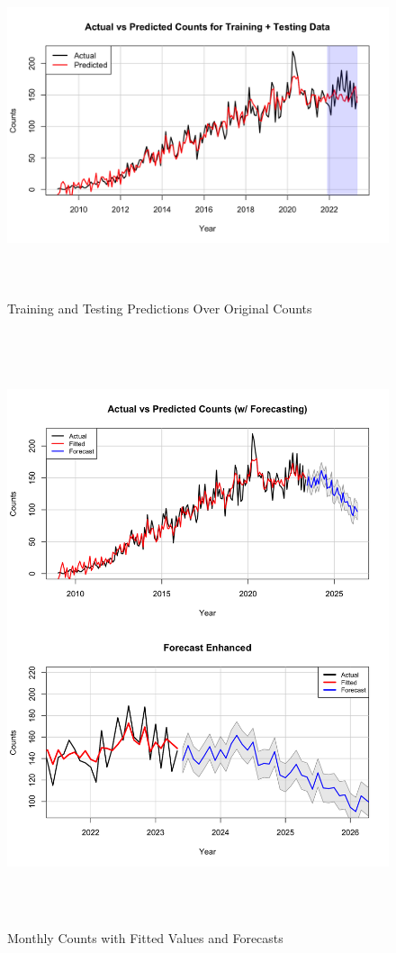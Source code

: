 \documentclass[10pt]{article}
\begin{document}
\begin{figure}[ht!]
    \centering
    \includegraphics[height=100mm, width=125mm]{pred_counts_overlayed.png}
    \caption{Training and Testing Predictions Over Original Counts}
\end{figure}

\begin{figure}[ht!]
    \centering
    \includegraphics[height=175mm, width=145mm]{forecasting.png}
    \caption{Monthly Counts with Fitted Values and Forecasts}
\end{figure}
\end{document}
